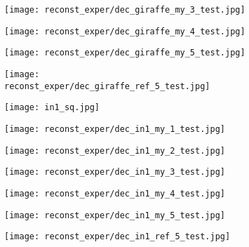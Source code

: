 \begin{figure}[H]
\begin{subfigure}[b]{0.13\linewidth}
		\texttt{[image: reconst\_exper/dec\_giraffe\_my\_3\_test.jpg]} %
	\end{subfigure}
	\begin{subfigure}[b]{0.13\linewidth}
		\texttt{[image: reconst\_exper/dec\_giraffe\_my\_4\_test.jpg]} %
	\end{subfigure}
	\begin{subfigure}[b]{0.13\linewidth}
		\texttt{[image: reconst\_exper/dec\_giraffe\_my\_5\_test.jpg]} %
	\end{subfigure}
	\begin{subfigure}[b]{0.13\linewidth}
		\texttt{[image: reconst\_exper/dec\_giraffe\_ref\_5\_test.jpg]} %
	\end{subfigure}
	\centering
	\begin{subfigure}[b]{0.13\linewidth}
		\texttt{[image: in1\_sq.jpg]} %
	\end{subfigure}
	\begin{subfigure}[b]{0.13\linewidth}
		\texttt{[image: reconst\_exper/dec\_in1\_my\_1\_test.jpg]} %
	\end{subfigure}
	\begin{subfigure}[b]{0.13\linewidth}
		\texttt{[image: reconst\_exper/dec\_in1\_my\_2\_test.jpg]} %
	\end{subfigure}
	\begin{subfigure}[b]{0.13\linewidth}
		\texttt{[image: reconst\_exper/dec\_in1\_my\_3\_test.jpg]} %
	\end{subfigure}
	\begin{subfigure}[b]{0.13\linewidth}
		\texttt{[image: reconst\_exper/dec\_in1\_my\_4\_test.jpg]} %
	\end{subfigure}
	\begin{subfigure}[b]{0.13\linewidth}
		\texttt{[image: reconst\_exper/dec\_in1\_my\_5\_test.jpg]} %
	\end{subfigure}
	\begin{subfigure}[b]{0.13\linewidth}
		\texttt{[image: reconst\_exper/dec\_in1\_ref\_5\_test.jpg]} %
	\end{subfigure}

\end{figure}
